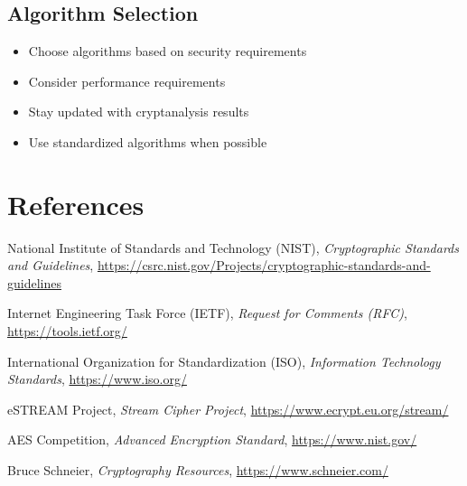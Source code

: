 \documentclass[11pt,a4paper]{article}
\begin{document}
\subsection{Algorithm Selection}
\begin{itemize}
    \item Choose algorithms based on security requirements
    \item Consider performance requirements
    \item Stay updated with cryptanalysis results
    \item Use standardized algorithms when possible
\end{itemize}

\section{References}

\begin{thebibliography}{99}
 National Institute of Standards and Technology (NIST), \textit{Cryptographic Standards and Guidelines}, \url{https://csrc.nist.gov/Projects/cryptographic-standards-and-guidelines}

 Internet Engineering Task Force (IETF), \textit{Request for Comments (RFC)}, \url{https://tools.ietf.org/}

 International Organization for Standardization (ISO), \textit{Information Technology Standards}, \url{https://www.iso.org/}

 eSTREAM Project, \textit{Stream Cipher Project}, \url{https://www.ecrypt.eu.org/stream/}

 AES Competition, \textit{Advanced Encryption Standard}, \url{https://www.nist.gov/}

 Bruce Schneier, \textit{Cryptography Resources}, \url{https://www.schneier.com/}
\end{thebibliography}
\end{document}
